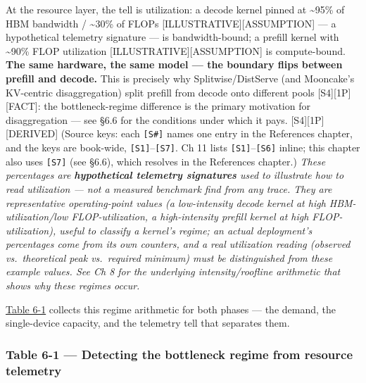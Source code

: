 At the resource layer, the tell is utilization: a decode kernel pinned
at \textasciitilde95\% of HBM bandwidth / \textasciitilde30\% of FLOPs
\mbox{{[}ILLUSTRATIVE{]}}\hspace{0pt}\mbox{{[}ASSUMPTION{]}} --- a hypothetical telemetry
signature --- is bandwidth-bound; a prefill kernel with
\textasciitilde90\% FLOP utilization \mbox{{[}ILLUSTRATIVE{]}}\hspace{0pt}\mbox{{[}ASSUMPTION{]}}
is compute-bound. \textbf{The same hardware, the same model --- the
boundary flips between prefill and decode.} This is precisely why
Splitwise/DistServe (and Mooncake's KV-centric disaggregation) split
prefill from decode onto different pools \mbox{{[}S4{]}}\hspace{0pt}\mbox{{[}1P{]}}\hspace{0pt}\mbox{{[}FACT{]}}: the
bottleneck-regime difference is the primary motivation for
disaggregation --- see §6.6 for the conditions under which it pays.
\mbox{{[}S4{]}}\hspace{0pt}\mbox{{[}1P{]}}\hspace{0pt}\mbox{{[}DERIVED{]}} (Source keys: each \texttt{{[}S\#{]}}
names one entry in the References chapter, and the keys are book-wide,
\texttt{\mbox{{[}S1{]}}}--\texttt{\mbox{{[}S7{]}}}. Ch 11 lists
\texttt{\mbox{{[}S1{]}}}--\texttt{\mbox{{[}S6{]}}} inline; this chapter also uses
\texttt{\mbox{{[}S7{]}}} (see §6.6), which resolves in the References chapter.)
\emph{These percentages are \textbf{hypothetical telemetry signatures}
used to illustrate how to read utilization --- not a measured benchmark
find from any trace. They are representative operating-point values (a
low-intensity decode kernel at high HBM-utilization/low
FLOP-utilization, a high-intensity prefill kernel at high
FLOP-utilization), useful to classify a kernel's regime; an actual
deployment's percentages come from its own counters, and a real
utilization reading (observed vs.~theoretical peak vs.~required minimum)
must be distinguished from these example values. See Ch 8 for the
underlying intensity/roofline arithmetic that shows why these regimes
occur.}

\Needspace{250pt}

\hyperref[tab:6.1]{Table 6-1} collects this regime arithmetic for both phases --- the
demand, the single-device capacity, and the telemetry tell that
separates them.

\subsubsection{Table 6-1 --- Detecting the bottleneck regime from
resource
telemetry}\label{table-6-1-detecting-the-bottleneck-regime-from-resource-telemetry}

